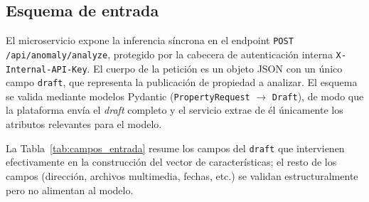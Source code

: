 

\subsection{Esquema de entrada}

El microservicio expone la inferencia síncrona en el endpoint
\texttt{POST /api/anomaly/analyze}, protegido por la cabecera de autenticación
interna \texttt{X-Internal-API-Key}. El cuerpo de la petición es un objeto JSON
con un único campo \texttt{draft}, que representa la publicación de propiedad a
analizar. El esquema se valida mediante modelos Pydantic
(\texttt{PropertyRequest} $\rightarrow$ \texttt{Draft}), de modo que la
plataforma envía el \textit{draft} completo y el servicio extrae de él únicamente
los atributos relevantes para el modelo.

La Tabla~\ref{tab:campos_entrada} resume los campos del \texttt{draft} que
intervienen efectivamente en la construcción del vector de características; el
resto de los campos (dirección, archivos multimedia, fechas, etc.) se validan
estructuralmente pero no alimentan al modelo.

